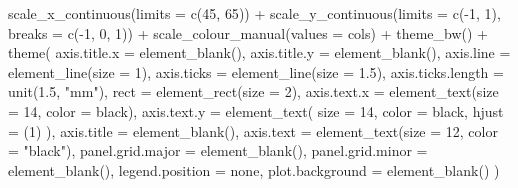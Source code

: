 \documentclass[
]{krantz}
\makeatletter
\newenvironment{Shaded}{\begin{snugshade}}{\end{snugshade}}
\newcommand{\AttributeTok}[1]{\textcolor[rgb]{0.77,0.63,0.00}{#1}}
\newcommand{\DecValTok}[1]{\textcolor[rgb]{0.00,0.00,0.81}{#1}}
\newcommand{\FloatTok}[1]{\textcolor[rgb]{0.00,0.00,0.81}{#1}}
\newcommand{\FunctionTok}[1]{\textcolor[rgb]{0.00,0.00,0.00}{#1}}
\newcommand{\NormalTok}[1]{#1}
\newcommand{\SpecialCharTok}[1]{\textcolor[rgb]{0.00,0.00,0.00}{#1}}
\newcommand{\StringTok}[1]{\textcolor[rgb]{0.31,0.60,0.02}{#1}}
\newenvironment{kframe}{%
\medskip{}
\setlength{\fboxsep}{.8em}
 \def\at@end@of@kframe{}%
 \ifinner\ifhmode%
  \def\at@end@of@kframe{\end{minipage}}%
  \begin{minipage}{\columnwidth}%
 \fi\fi%
 \def\FrameCommand##1{\hskip\@totalleftmargin \hskip-\fboxsep
 \colorbox{shadecolor}{##1}\hskip-\fboxsep
     \hskip-\linewidth \hskip-\@totalleftmargin \hskip\columnwidth}%
 \MakeFramed {\advance\hsize-\width
   \@totalleftmargin\z@ \linewidth\hsize
   \@setminipage}}%
 {\par\unskip\endMakeFramed%
 \at@end@of@kframe}
\renewenvironment{Shaded}{\begin{kframe}}{\end{kframe}}
\makeatother
\begin{document}
\begin{Shaded}
\begin{Highlighting}[]
  \FunctionTok{scale\_x\_continuous}\NormalTok{(}\AttributeTok{limits =} \FunctionTok{c}\NormalTok{(}\DecValTok{45}\NormalTok{, }\DecValTok{65}\NormalTok{)) }\SpecialCharTok{+}
  \FunctionTok{scale\_y\_continuous}\NormalTok{(}\AttributeTok{limits =} \FunctionTok{c}\NormalTok{(}\SpecialCharTok{{-}}\DecValTok{1}\NormalTok{, }\DecValTok{1}\NormalTok{), }\AttributeTok{breaks =} \FunctionTok{c}\NormalTok{(}\SpecialCharTok{{-}}\DecValTok{1}\NormalTok{, }\DecValTok{0}\NormalTok{, }\DecValTok{1}\NormalTok{)) }\SpecialCharTok{+}
  \FunctionTok{scale\_colour\_manual}\NormalTok{(}\AttributeTok{values =}\NormalTok{ cols) }\SpecialCharTok{+}
  \FunctionTok{theme\_bw}\NormalTok{() }\SpecialCharTok{+}
  \FunctionTok{theme}\NormalTok{(}
    \AttributeTok{axis.title.x =} \FunctionTok{element\_blank}\NormalTok{(),}
    \AttributeTok{axis.title.y =} \FunctionTok{element\_blank}\NormalTok{(),}
    \AttributeTok{axis.line =} \FunctionTok{element\_line}\NormalTok{(}\AttributeTok{size =} \DecValTok{1}\NormalTok{),}
    \AttributeTok{axis.ticks =} \FunctionTok{element\_line}\NormalTok{(}\AttributeTok{size =} \FloatTok{1.5}\NormalTok{),}
    \AttributeTok{axis.ticks.length =} \FunctionTok{unit}\NormalTok{(}\FloatTok{1.5}\NormalTok{, }\StringTok{"mm"}\NormalTok{),}
    \AttributeTok{rect =} \FunctionTok{element\_rect}\NormalTok{(}\AttributeTok{size =} \DecValTok{2}\NormalTok{),}
    \AttributeTok{axis.text.x =} \FunctionTok{element\_text}\NormalTok{(}\AttributeTok{size =} \DecValTok{14}\NormalTok{, }\AttributeTok{color =} \StringTok{\textquotesingle{}black\textquotesingle{}}\NormalTok{),}
    \AttributeTok{axis.text.y =}
      \FunctionTok{element\_text}\NormalTok{(}
        \AttributeTok{size =} \DecValTok{14}\NormalTok{,}
        \AttributeTok{color =} \StringTok{\textquotesingle{}black\textquotesingle{}}\NormalTok{,}
        \AttributeTok{hjust =}\NormalTok{ (}\DecValTok{1}\NormalTok{)}
\NormalTok{      ),}
    \AttributeTok{axis.title =} \FunctionTok{element\_blank}\NormalTok{(),}
    \AttributeTok{axis.text =} \FunctionTok{element\_text}\NormalTok{(}\AttributeTok{size =} \DecValTok{12}\NormalTok{, }\AttributeTok{color =} \StringTok{"black"}\NormalTok{),}
    \AttributeTok{panel.grid.major =} \FunctionTok{element\_blank}\NormalTok{(),}
    \AttributeTok{panel.grid.minor =} \FunctionTok{element\_blank}\NormalTok{(),}
    \AttributeTok{legend.position =} \StringTok{\textquotesingle{}none\textquotesingle{}}\NormalTok{,}
    \AttributeTok{plot.background =} \FunctionTok{element\_blank}\NormalTok{()}
\NormalTok{  )}




\end{Highlighting}
\end{Shaded}
\end{document}
